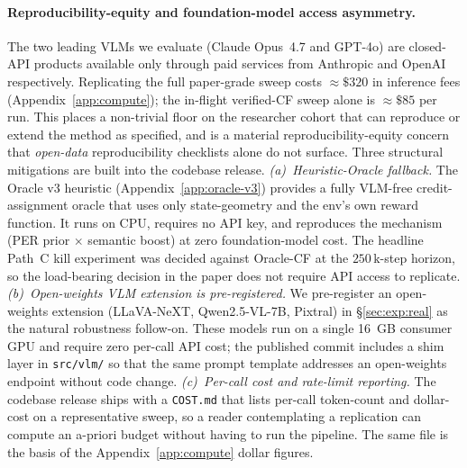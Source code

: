 \paragraph{Reproducibility-equity and foundation-model access
asymmetry.}
The two leading VLMs we evaluate (Claude Opus~4.7 and GPT-4o) are
closed-API products available only through paid services from
Anthropic and OpenAI respectively. Replicating the full paper-grade
sweep costs $\approx\!\$320$ in inference fees
(Appendix~\ref{app:compute}); the in-flight verified-CF sweep alone
is $\approx\!\$85$ per run. This places a non-trivial floor on the
researcher cohort that can reproduce or extend the method as
specified, and is a material reproducibility-equity concern that
\emph{open-data} reproducibility checklists alone do not surface.
Three structural mitigations are built into the codebase release.
\emph{(a)~Heuristic-Oracle fallback.} The Oracle v3 heuristic
(Appendix~\ref{app:oracle-v3}) provides a fully VLM-free credit-assignment
oracle that uses only state-geometry and the env's own reward
function. It runs on CPU, requires no API key, and reproduces the
mechanism (PER prior $\times$ semantic boost) at zero
foundation-model cost. The headline Path~C kill experiment was decided
against Oracle-CF at the $250\,\mathrm{k}$-step horizon, so the
load-bearing decision in the paper does not require API access to
replicate.
\emph{(b)~Open-weights VLM extension is pre-registered.} We
pre-register an open-weights extension (LLaVA-NeXT, Qwen2.5-VL-7B,
Pixtral) in \S\ref{sec:exp:real} as the natural robustness
follow-on. These models run on a single 16~GB consumer GPU and
require zero per-call API cost; the published commit includes a
shim layer in \texttt{src/vlm/} so that the same prompt template
addresses an open-weights endpoint without code change.
\emph{(c)~Per-call cost and rate-limit reporting.} The codebase
release ships with a \texttt{COST.md} that lists per-call token-count
and dollar-cost on a representative sweep, so a reader contemplating
a replication can compute an a-priori budget without having to run
the pipeline. The same file is the basis of the
Appendix~\ref{app:compute} dollar figures.

